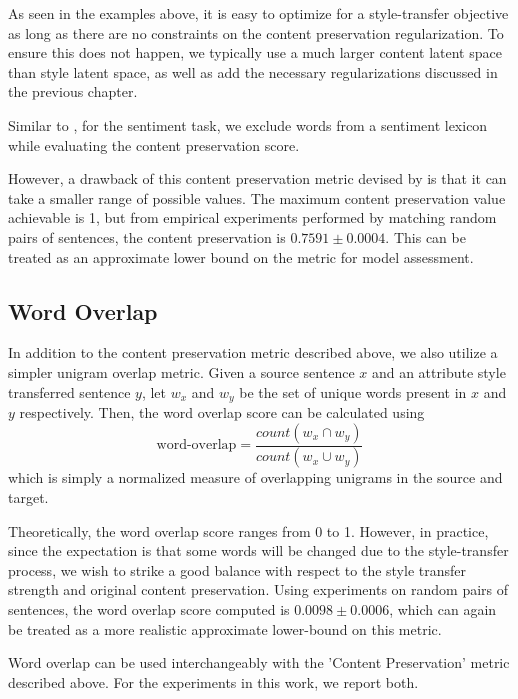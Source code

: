 As seen in the examples above, it is easy to optimize for a style-transfer objective as long as there are no constraints on the content preservation regularization. To ensure this does not happen, we typically use a much larger content latent space than style latent space, as well as add the necessary regularizations discussed in the previous chapter.

Similar to \cite{fu2017style}, for the sentiment task, we exclude words from a sentiment lexicon \citep{hu2004mining} while evaluating the content preservation score.

However, a drawback of this content preservation metric devised by \cite{fu2017style} is that it can take a smaller range of possible values. The maximum content preservation value achievable is 1, but from empirical experiments performed by matching random pairs of sentences, the content preservation is $0.7591 \pm 0.0004$. This can be treated as an approximate lower bound on the metric for model assessment.

\subsection{Word Overlap}

In addition to the content preservation metric described above, we also utilize a simpler unigram overlap metric. Given a source sentence $x$ and an attribute style transferred sentence $y$, let $w_x$ and $w_y$ be the set of unique words present in $x$ and $y$ respectively. Then, the word overlap score can be calculated using
\begin{equation*}
	\text{word-overlap} = \frac{count(w_x \cap w_y)}{count(w_x \cup w_y)}
\end{equation*}
which is simply a normalized measure of overlapping unigrams in the source and target.

Theoretically, the word overlap score ranges from 0 to 1. However, in practice, since the expectation is that some words will be changed due to the style-transfer process, we wish to strike a good balance with respect to the style transfer strength and original content preservation. Using experiments on random pairs of sentences, the word overlap score computed is $0.0098 \pm 0.0006$, which can again be treated as a more realistic approximate lower-bound on this metric.

Word overlap can be used interchangeably with the 'Content Preservation' metric described above. For the experiments in this work, we report both.


